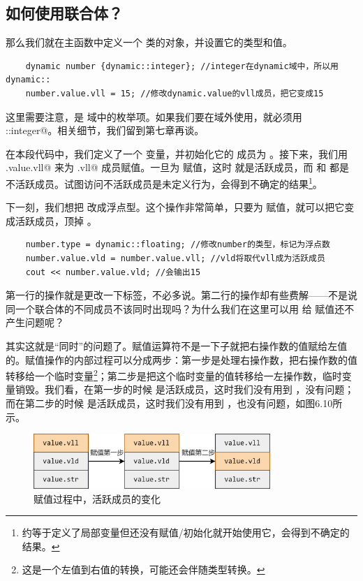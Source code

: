 \subsection*{如何使用联合体？}
那么我们就在主函数中定义一个 \lstinline@dynamic@ 类的对象，并设置它的类型和值。
\begin{lstlisting}
    dynamic number {dynamic::integer}; //integer在dynamic域中，所以用dynamic::
    number.value.vll = 15; //修改dynamic.value的vll成员，把它变成15
\end{lstlisting}
这里需要注意，\lstinline@integer@ 是 \lstinline@dynamic@ 域中的枚举项。如果我们要在域外使用，就必须用\\\lstinline@dynamic::integer@。相关细节，我们留到第七章再谈。\par
在本段代码中，我们定义了一个 \lstinline@number@ 变量，并初始化它的 \lstinline@type@ 成员为 \lstinline@integer@。接下来，我们用 \lstinline@number.value.vll@ 来为 \lstinline@value.vll@ 成员赋值。一旦为 \lstinline@vll@ 赋值，这时 \lstinline@vll@ 就是活跃成员，而 \lstinline@vld@ 和 \lstinline@str@ 都是不活跃成员。试图访问不活跃成员是未定义行为，会得到不确定的结果\footnote{约等于定义了局部变量但还没有赋值/初始化就开始使用它，会得到不确定的结果。}。\par
下一刻，我们想把 \lstinline@number@ 改成浮点型。这个操作非常简单，只要为 \lstinline@vld@ 赋值，就可以把它变成活跃成员，顶掉 \lstinline@vll@。\par
\begin{lstlisting}
    number.type = dynamic::floating; //修改number的类型，标记为浮点数
    number.value.vld = number.value.vll; //vld将取代vll成为活跃成员
    cout << number.value.vld; //会输出15
\end{lstlisting}
第一行的操作就是更改一下标签，不必多说。第二行的操作却有些费解——不是说同一个联合体的不同成员不该同时出现吗？为什么我们在这里可以用 \lstinline@vll@ 给 \lstinline@vld@ 赋值还不产生问题呢？\par
其实这就是``同时''的问题了。赋值运算符不是一下子就把右操作数的值赋给左值的。赋值操作的内部过程可以分成两步：第一步是处理右操作数，把右操作数的值转移给一个临时变量\footnote{这是一个左值到右值的转换，可能还会伴随类型转换。}；第二步是把这个临时变量的值转移给一左操作数，临时变量销毁。我们看，在第一步的时候 \lstinline@vll@ 是活跃成员，这时我们没有用到 \lstinline@vld@，没有问题；而在第二步的时候 \lstinline@vld@ 是活跃成员，这时我们没有用到 \lstinline@vll@，也没有问题，如图6.10所示。\par
\begin{figure}[htbp]
    \centering
    \includegraphics[width=0.8\textwidth]{../images/generalized_parts/06_process_of_assignment_to_union.drawio.png}
    \caption{赋值过程中，活跃成员的变化}
\end{figure}
